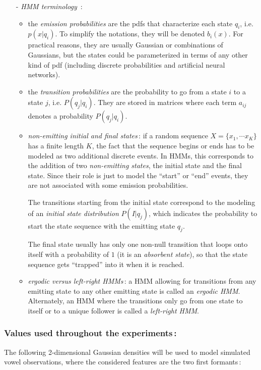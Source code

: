 \documentclass[twoside,a4paper,titlepage]{article}
\begin{document}
\begin{itemize}
\item[-] {\em HMM terminology} \,:
\begin{itemize}
\item the {\em emission probabilities} are the pdfs that characterize each
state $q_i$, i.e. $p(x|q_i)$. To simplify the notations, they will be
denoted $b_i(x)$. For practical reasons, they are usually Gaussian or
combinations of Gaussians, but the states could be parameterized in terms
of any other kind of pdf (including discrete probabilities and artificial
neural networks).
\item the {\em transition probabilities} are the probability to go from a
state $i$ to a state $j$, i.e. $P(q_j|q_i)$. They are stored in matrices
where each term $a_{ij}$ denotes a probability $P(q_j|q_i)$.
\item {\em non-emitting initial and final states}\,: if a random sequence
$X=\{x_1,\cdots x_K\}$ has a finite length $K$, the fact that the sequence
begins or ends has to be modeled as two additional discrete events. In
HMMs, this corresponds to the addition of two {\em non-emitting states},
the initial state and the final state. Since their role is just to model
the ``start'' or ``end'' events, they are not associated with some emission
probabilities.

The transitions starting from the initial state correspond to the modeling
of an {\em initial state distribution} $P(I|q_j)$, which indicates the
probability to start the state sequence with the emitting state $q_j$.

The final state usually has only one non-null transition that loops onto
itself with a probability of $1$ (it is an {\em absorbent state}), so that
the state sequence gets ``trapped'' into it when it is reached.

\item {\em ergodic versus left-right HMMs}\,: a HMM allowing for
transitions from any emitting state to any other emitting state is called
an {\em ergodic HMM}. Alternately, an HMM where the transitions only go
from one state to itself or to a unique follower is called a {\em
left-right HMM}.
\end{itemize}
\end{itemize}

\subsubsection*{Values used throughout the experiments\,:}

The following 2-dimensional Gaussian densities will be used to model
simulated vowel observations, where the considered features are the two
first formants\,:
\end{document}
